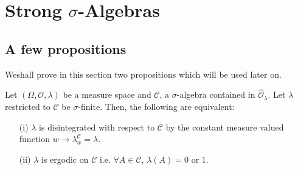 
\chapter{Strong $\sigma$-Algebras}\label{part2:chap7}

\section{A few propositions}\label{part2:chap7:sec1}

We\pageoriginale shall prove in this section two propositions which
will be used later on.

\begin{proposition}\label{part2:chap7:prop95}
Let $(\Omega, \mathscr{O}, \lambda)$ be a measure space and
$\mathscr{C}$, a $\sigma$-algebra contained in
$\hat{\mathscr{O}}_\lambda$. Let $\lambda$ restricted to $\mathscr{C}$
be $\sigma$-finite. Then, the following are equivalent:
\begin{itemize}
\item[{\rm (i)}] $\lambda$ is disintegrated with respect to
  $\mathscr{C}$  by the constant measure valued function $w \to
  \lambda^\mathscr{C}_w = \lambda$. 

\item[{\rm (ii)}] $\lambda$ is ergodic on $\mathscr{C}$ i.e. $\forall
  A \in \mathscr{C}$, $\lambda(A) =0$ or $1$.
\end{itemize}
\end{proposition}

